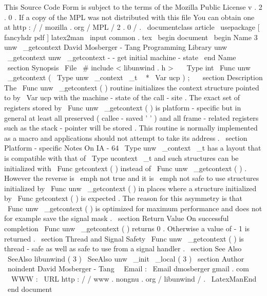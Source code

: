 %
This
Source
Code
Form
is
subject
to
the
terms
of
the
Mozilla
Public
%
License
v
.
2
.
0
.
If
a
copy
of
the
MPL
was
not
distributed
with
this
%
file
You
can
obtain
one
at
http
:
/
/
mozilla
.
org
/
MPL
/
2
.
0
/
.
\
documentclass
{
article
}
\
usepackage
[
fancyhdr
pdf
]
{
latex2man
}
\
input
{
common
.
tex
}
\
begin
{
document
}
\
begin
{
Name
}
{
3
}
{
unw
\
_getcontext
}
{
David
Mosberger
-
Tang
}
{
Programming
Library
}
{
unw
\
_getcontext
}
unw
\
_getcontext
-
-
get
initial
machine
-
state
\
end
{
Name
}
\
section
{
Synopsis
}
\
File
{
\
#
include
<
libunwind
.
h
>
}
\
\
\
Type
{
int
}
\
Func
{
unw
\
_getcontext
}
(
\
Type
{
unw
\
_context
\
_t
~
*
}
\
Var
{
ucp
}
)
;
\
\
\
section
{
Description
}
The
\
Func
{
unw
\
_getcontext
}
(
)
routine
initializes
the
context
structure
pointed
to
by
\
Var
{
ucp
}
with
the
machine
-
state
of
the
call
-
site
.
The
exact
set
of
registers
stored
by
\
Func
{
unw
\
_getcontext
}
(
)
is
platform
-
specific
but
in
general
at
least
all
preserved
(
callee
-
saved
'
'
)
and
all
frame
-
related
registers
such
as
the
stack
-
pointer
will
be
stored
.
This
routine
is
normally
implemented
as
a
macro
and
applications
should
not
attempt
to
take
its
address
.
\
section
{
Platform
-
specific
Notes
}
On
IA
-
64
\
Type
{
unw
\
_context
\
_t
}
has
a
layout
that
is
compatible
with
that
of
\
Type
{
ucontext
\
_t
}
and
such
structures
can
be
initialized
with
\
Func
{
getcontext
}
(
)
instead
of
\
Func
{
unw
\
_getcontext
}
(
)
.
However
the
reverse
is
\
emph
{
not
}
true
and
it
is
\
emph
{
not
}
safe
to
use
structures
initialized
by
\
Func
{
unw
\
_getcontext
(
)
}
in
places
where
a
structure
initialized
by
\
Func
{
getcontext
(
)
}
is
expected
.
The
reason
for
this
asymmetry
is
that
\
Func
{
unw
\
_getcontext
(
)
}
is
optimized
for
maximum
performance
and
does
not
for
example
save
the
signal
mask
.
\
section
{
Return
Value
}
On
successful
completion
\
Func
{
unw
\
_getcontext
}
(
)
returns
0
.
Otherwise
a
value
of
-
1
is
returned
.
\
section
{
Thread
and
Signal
Safety
}
\
Func
{
unw
\
_getcontext
}
(
)
is
thread
-
safe
as
well
as
safe
to
use
from
a
signal
handler
.
\
section
{
See
Also
}
\
SeeAlso
{
libunwind
(
3
)
}
\
SeeAlso
{
unw
\
_init
\
_local
(
3
)
}
\
section
{
Author
}
\
noindent
David
Mosberger
-
Tang
\
\
Email
:
\
Email
{
dmosberger
gmail
.
com
}
\
\
WWW
:
\
URL
{
http
:
/
/
www
.
nongnu
.
org
/
libunwind
/
}
.
\
LatexManEnd
\
end
{
document
}
